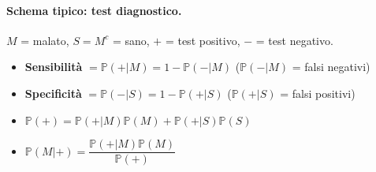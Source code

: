 \documentclass[12pt]{extarticle} %
\begin{document}
\vspace{0.3cm}
\paragraph{Schema tipico: test diagnostico.} $M$ = malato, $S = M^c$ = sano, $+$ = test positivo, $-$ = test negativo.
\begin{itemize}
    \item \textbf{Sensibilità} $= \mathbb{P}(+|M) = 1 - \mathbb{P}(-|M)$ \quad ($\mathbb{P}(-|M)$ = falsi negativi)
    \item \textbf{Specificità} $= \mathbb{P}(-|S) = 1 - \mathbb{P}(+|S)$ \quad ($\mathbb{P}(+|S)$ = falsi positivi)
    \item $\mathbb{P}(+) = \mathbb{P}(+|M)\mathbb{P}(M) + \mathbb{P}(+|S)\mathbb{P}(S)$
    \item $\mathbb{P}(M|+) = \dfrac{\mathbb{P}(+|M)\mathbb{P}(M)}{\mathbb{P}(+)}$ 
\end{itemize}

\vspace{0.3cm}
\end{document}
